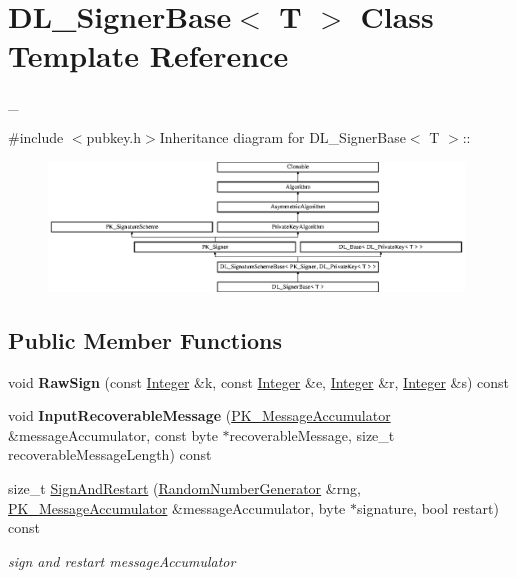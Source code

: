 \hypertarget{class_d_l___signer_base}{
\section{DL\_\-SignerBase$<$ T $>$ Class Template Reference}
\label{class_d_l___signer_base}
}


\_\-  


{\ttfamily \#include $<$pubkey.h$>$}Inheritance diagram for DL\_\-SignerBase$<$ T $>$::\begin{figure}[H]
\begin{center}
\leavevmode
\includegraphics[height=3.44767cm]{class_d_l___signer_base}
\end{center}
\end{figure}
\subsection*{Public Member Functions}
\begin{DoxyCompactItemize}
\item 
\hypertarget{class_d_l___signer_base_afb883276d98b4b2086c016c68d4aa22c}{
void {\bfseries RawSign} (const \hyperlink{class_integer}{Integer} \&k, const \hyperlink{class_integer}{Integer} \&e, \hyperlink{class_integer}{Integer} \&r, \hyperlink{class_integer}{Integer} \&s) const }
\label{class_d_l___signer_base_afb883276d98b4b2086c016c68d4aa22c}

\item 
\hypertarget{class_d_l___signer_base_affc7daf6e470600046a2741ad5098f74}{
void {\bfseries InputRecoverableMessage} (\hyperlink{class_p_k___message_accumulator}{PK\_\-MessageAccumulator} \&messageAccumulator, const byte $\ast$recoverableMessage, size\_\-t recoverableMessageLength) const }
\label{class_d_l___signer_base_affc7daf6e470600046a2741ad5098f74}

\item 
size\_\-t \hyperlink{class_d_l___signer_base_a1c0d9588fc5a340a14342c474b2a52e2}{SignAndRestart} (\hyperlink{class_random_number_generator}{RandomNumberGenerator} \&rng, \hyperlink{class_p_k___message_accumulator}{PK\_\-MessageAccumulator} \&messageAccumulator, byte $\ast$signature, bool restart) const 
\begin{DoxyCompactList}\small\item\em sign and restart messageAccumulator \item\end{DoxyCompactList}\end{DoxyCompactItemize}
